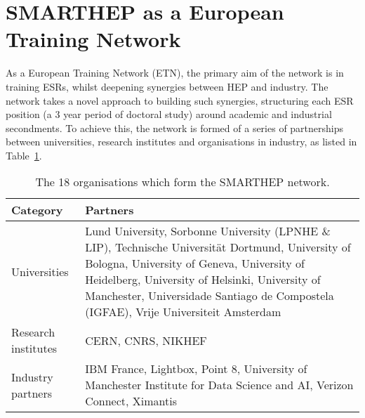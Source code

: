 \section{SMARTHEP as a European Training Network}
\label{network}
As a European Training Network (ETN), the primary aim of the network is in training ESRs, whilst deepening synergies between HEP and industry. The network takes a novel approach to building such synergies, structuring each ESR position (a 3 year period of doctoral study) around academic and industrial secondments. To achieve this, the network is formed of a series of partnerships between universities, research institutes and organisations in industry, as listed in Table~\ref{partners}.\par

\begin{table}[h!]
    \centering
    \small
    \begin{tabular}{p{2.5cm}p{9.5cm}}
    \hline
    Category & Partners \\\hline
    Universities & Lund University, Sorbonne University (LPNHE \& LIP), Technische Universit\"at Dortmund, University of Bologna, University of Geneva, University of Heidelberg, University of Helsinki, University of Manchester, Universidade Santiago de Compostela (IGFAE), Vrije Universiteit Amsterdam \\\hline
    Research institutes & CERN, CNRS, NIKHEF  \\\hline
    Industry partners & IBM France, Lightbox, Point 8, University of Manchester Institute for Data Science and AI, Verizon Connect, Ximantis\\\hline
    \end{tabular}
    \caption{The 18 organisations which form the SMARTHEP network.}
    \label{partners}       
\end{table}

